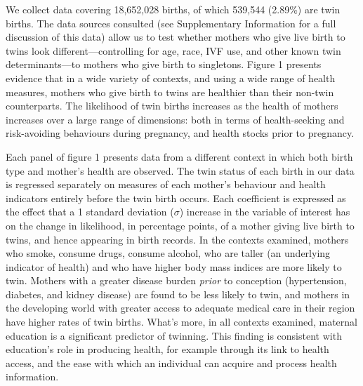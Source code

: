 \documentclass{nature}
\begin{document}
\begin{linenumbers}
We collect data covering 18,652,028 births, of which 539,544 (2.89\%) are twin births. The data sources consulted (see Supplementary Information for a full discussion of this data) allow us to test whether mothers who give live birth to twins look different---controlling for age, race, IVF use, and other known twin determinants\cite{Hoekstraetal2008}---to mothers who give birth to singletons.  Figure 1 presents evidence that in a wide variety of contexts, and using a wide range of health measures, mothers who give birth to twins are healthier than their non-twin counterparts. The likelihood of twin births increases as the health of mothers increases over a large range of dimensions: both in terms of health-seeking and risk-avoiding behaviours during pregnancy, and health stocks prior to pregnancy.

Each panel of figure 1 presents data from a different context in which both birth type and mother's health are observed.  The twin status of each birth in our data is regressed separately on measures of each mother's behaviour and health indicators entirely before the twin birth occurs.  Each coefficient is expressed as the effect that a 1 standard deviation ($\sigma$) increase in the variable of interest has on the change in likelihood, in percentage points, of a mother giving live birth to twins, and hence appearing in birth records.  In the contexts examined, mothers who smoke, consume drugs, consume alcohol, who are taller (an underlying indicator of health\cite{Silventoinen2003,BhalotraRawlings2013}) and who have higher body mass indices are more likely to twin.  Mothers with a greater disease burden \emph{prior} to conception (hypertension, diabetes, and kidney disease) are found to be less likely to twin, and mothers in the developing world with greater access to adequate medical care in their region have higher rates of twin births.  What's more, in all contexts examined, maternal education is a significant predictor of twinning.  This finding is consistent with education's role in producing health, for example through its link to health access, and the ease with which an individual can acquire and process health information\cite{Kenkel1991,CutlerLlerasMuney2010}.


\end{linenumbers}
\end{document}

